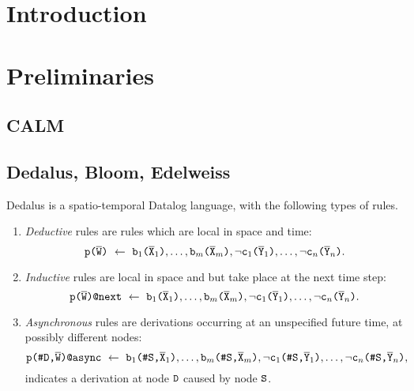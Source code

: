 \documentclass{article}
\numberwithin{equation}{section}
\renewcommand{\tt}[1]{\ifmmode\text{\texttt{#1}}\else\texttt{#1}\fi}
\begin{document}
\section{Introduction}

\section{Preliminaries}
\subsection{CALM}

\subsection{Dedalus, Bloom, Edelweiss}
Dedalus is a spatio-temporal Datalog language, with the following types of rules.
\begin{enumerate}
\item \emph{Deductive} rules are rules which are local in space and time:
	\[\tt{p(}\overline{\tt{W}}\tt{)} ~\leftarrow~ \tt{b}_1\tt{(}\overline{\tt{X}}_1\tt{)}, \dots, \tt{b}_m\tt{(}\overline{\tt{X}}_m\tt{)}, \neg\tt{c}_1\tt{(}\overline{\tt{Y}}_1\tt{)}, \dots, \neg\tt{c}_n\tt{(}\overline{\tt{Y}}_n\tt{)}.\]
\item \emph{Inductive} rules are local in space and but take place at the next time step:
	\[\tt{p(}\overline{\tt{W}}\tt{)@next} ~\leftarrow~ \tt{b}_1\tt{(}\overline{\tt{X}}_1\tt{)}, \dots, \tt{b}_m\tt{(}\overline{\tt{X}}_m\tt{)}, \neg\tt{c}_1\tt{(}\overline{\tt{Y}}_1\tt{)}, \dots, \neg\tt{c}_n\tt{(}\overline{\tt{Y}}_n\tt{)}.\]
\item \emph{Asynchronous} rules are derivations occurring at an unspecified future time, at possibly different nodes:
	\[\tt{p(\#D,}\overline{\tt{W}}\tt{)@async} ~\leftarrow~ \tt{b}_1\tt{(\#S,}\overline{\tt{X}}_1\tt{)}, \dots, \tt{b}_m\tt{(\#S,}\overline{\tt{X}}_m\tt{)}, \neg\tt{c}_1\tt{(\#S,}\overline{\tt{Y}}_1\tt{)}, \dots, \neg\tt{c}_n\tt{(\#S,}\overline{\tt{Y}}_n\tt{)},\]
indicates a derivation at node $\tt{D}$ caused by node $\tt{S}$.
\end{enumerate}
\end{document}
